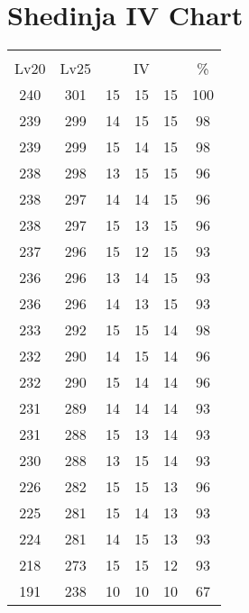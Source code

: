 \documentclass{article}%
\begin{document}
%
\normalsize%
\section{Shedinja IV Chart}%
\label{sec:Shedinja IV Chart}%
\renewcommand{\arraystretch}{1.5}%
\begin{tabular}{|c|c|c|c|c|c|}%
\hline%
\multicolumn{6}{|c|}{\textcolor{white}{ 
\linebreak{Shedinja}
}%
\cellcolor{black}}\\%
\multicolumn{1}{|c}{Lv20}&\multicolumn{1}{c|}{Lv25}&\multicolumn{3}{c|}{IV}&\multicolumn{1}{|c|}{\%}\\%
\hline%
\rowcolor{color100}%
240&301&15&15&15&100\\%
\hline%
\rowcolor{color98}%
239&299&14&15&15&98\\%
\hline%
\rowcolor{color98}%
239&299&15&14&15&98\\%
\hline%
\rowcolor{color96}%
238&298&13&15&15&96\\%
\hline%
\rowcolor{color96}%
238&297&14&14&15&96\\%
\hline%
\rowcolor{color96}%
238&297&15&13&15&96\\%
\hline%
\rowcolor{color93}%
237&296&15&12&15&93\\%
\hline%
\rowcolor{color93}%
236&296&13&14&15&93\\%
\hline%
\rowcolor{color93}%
236&296&14&13&15&93\\%
\hline%
\rowcolor{color98}%
233&292&15&15&14&98\\%
\hline%
\rowcolor{color96}%
232&290&14&15&14&96\\%
\hline%
\rowcolor{color96}%
232&290&15&14&14&96\\%
\hline%
\rowcolor{color93}%
231&289&14&14&14&93\\%
\hline%
\rowcolor{color93}%
231&288&15&13&14&93\\%
\hline%
\rowcolor{color93}%
230&288&13&15&14&93\\%
\hline%
\rowcolor{color96}%
226&282&15&15&13&96\\%
\hline%
\rowcolor{color93}%
225&281&15&14&13&93\\%
\hline%
\rowcolor{color93}%
224&281&14&15&13&93\\%
\hline%
\rowcolor{color93}%
218&273&15&15&12&93\\%
\hline%
\rowcolor{color91}%
191&238&10&10&10&67\\%
\end{tabular}

%
\end{document}
